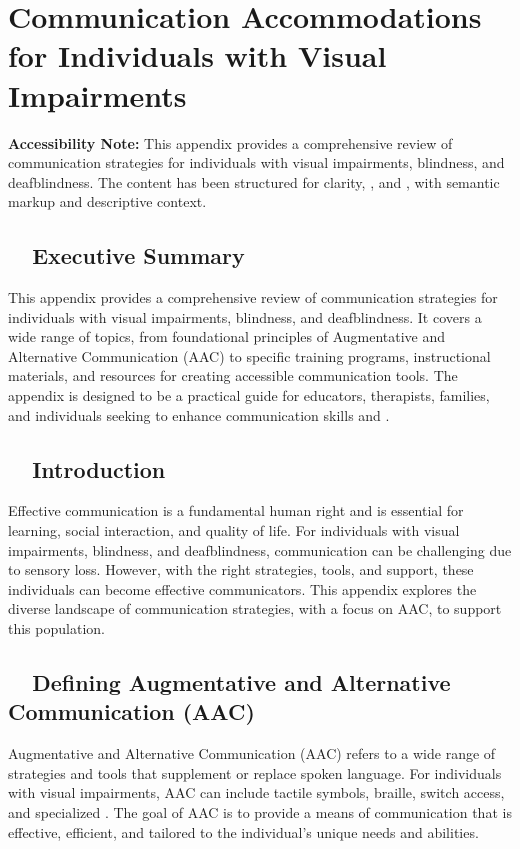 \chapter{Communication Accommodations for Individuals with Visual Impairments}\label{app6:appx6}

\begin{raggedright}
	\textbf{Accessibility Note:} This appendix provides a comprehensive review of communication strategies for individuals with visual impairments, blindness, and deafblindness. The content has been structured for clarity, , and , with semantic markup and descriptive context.
\end{raggedright}

\section{~~Executive Summary}\label{app6:exec-summary}
This appendix provides a comprehensive review of communication strategies for individuals with visual impairments, blindness, and deafblindness. It covers a wide range of topics, from foundational principles of Augmentative and Alternative Communication (AAC) to specific training programs, instructional materials, and resources for creating accessible communication tools. The appendix is designed to be a practical guide for educators, therapists, families, and individuals seeking to enhance communication skills and .

\section{~~Introduction}\label{app6:intro}
Effective \gls{communication} is a fundamental human right and is essential for learning, social interaction, and quality of life. For individuals with visual impairments, blindness, and deafblindness, \gls{communication} can be challenging due to sensory loss. However, with the right strategies, tools, and support, these individuals can become effective communicators. This appendix explores the diverse landscape of \gls{communication} strategies, with a focus on AAC, to support this population.

\section{~~Defining Augmentative and Alternative Communication (AAC)}\label{app6:define-aac}
Augmentative and Alternative Communication (AAC) refers to a wide range of strategies and tools that supplement or replace spoken language. For individuals with visual impairments, AAC can include tactile symbols, braille, switch access, and specialized . The goal of AAC is to provide a means of communication that is effective, efficient, and tailored to the individual's unique needs and abilities.

